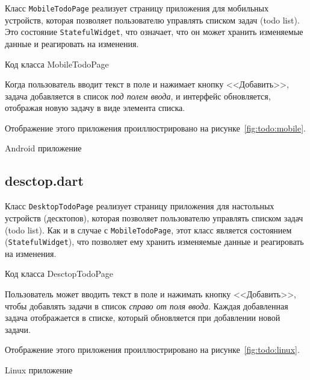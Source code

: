 Класс \texttt{MobileTodoPage}  реализует
страницу приложения для мобильных устройств,
которая позволяет пользователю управлять списком задач (todo list).
Это состояние \texttt{StatefulWidget}, что означает,
что он может хранить изменяемые данные и реагировать на изменения.

\begin{image}
	\caption{Код класса MobileTodoPage}
	\label{fig:lst:todo:mobile}
\end{image}

Когда пользователь вводит текст в поле и нажимает кнопку <<Добавить>>,
задача добавляется в список \textit{под полем ввода},
и интерфейс обновляется, отображая новую задачу в виде элемента списка.

Отображение этого приложения проиллюстрировано
на рисунке~\ref{fig:todo:mobile}.

\begin{image}
	\caption{Android приложение}
	\label{fig:todo:mobile}
\end{image}

\subsection{desctop.dart}

Класс \texttt{DesktopTodoPage} 
реализует страницу приложения для настольных устройств (десктопов),
которая позволяет пользователю управлять списком задач (todo list).
Как и в случае с \texttt{MobileTodoPage}, этот класс является состоянием
(\texttt{StatefulWidget}), что позволяет ему хранить изменяемые данные
и реагировать на изменения.

\begin{image}
	\caption{Код класса DesctopTodoPage}
	\label{fig:lst:todo:desctop}
\end{image}

Пользователь может вводить текст в поле и нажимать кнопку <<Добавить>>,
чтобы добавлять задачи в список \textit{справо от поля ввода}.
Каждая добавленная задача отображается в списке,
который обновляется при добавлении новой задачи.

Отображение этого приложения проиллюстрировано
на рисунке~\ref{fig:todo:linux}.

\begin{image}
	\caption{Linux приложение}
	\label{fig:todo:linux}
\end{image}

